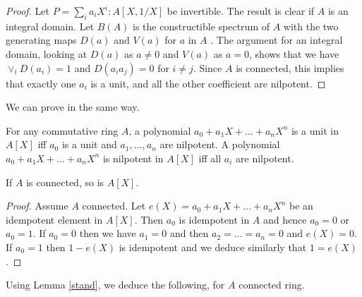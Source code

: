  \begin{proof}
   Let $P = \sum_i a_iX^i:A[X,1/X]$ be invertible.
   The result is clear if $A$ is an integral domain. Let $B(A)$ is the constructible spectrum of $A$
   with the two generating maps $D(a)$ and $V(a)$ for $a$ in $A$ \cite{lombardi-quitte}. The argument for an integral
   domain, looking at $D(a)$ as $a\neq 0$ and $V(a)$ as $a =0$, shows that we have $\vee_i D(a_i) = 1$
   and $D(a_ia_j) = 0$ for $i\neq j$. Since $A$ is connected, this implies that exactly one $a_i$ is a unit,
   and all the other coefficient are nilpotent.
 \end{proof}

 We can prove in the same way.

 \begin{lemma}\label{nilpunit}
   For any commutative ring $A$, a polynomial $a_0+a_1X+\dots+a_nX^n$ is a unit in $A[X]$ iff
   $a_0$ is a unit and $a_1,\dots,a_n$ are nilpotent. A polynomial $a_0+a_1X+\dots+a_nX^n$ is nilpotent in $A[X]$ iff
   all $a_i$ are nilpotent.
 \end{lemma}
 
 \begin{lemma}\label{connected}
   If $A$ is connected, so is $A[X]$.
 \end{lemma}

 \begin{proof}
   Assume $A$ connected.
   Let $e(X) = a_0+a_1X+\dots+a_nX^n$ be an idempotent element in $A[X]$. Then $a_0$ is idempotent in $A$
   and hence $a_0 = 0$ or $a_0 = 1$. If $a_0 = 0$ then we have $a_1 = 0$ and then $a_2 = \dots = a_n = 0$
   and $e(X) = 0$. If $a_0 = 1$ then $1-e(X)$ is idempotent and we deduce similarly that $1 = e(X)$.
  \end{proof}


 Using Lemma \ref{stand}, we deduce the following, for $A$ connected ring.

